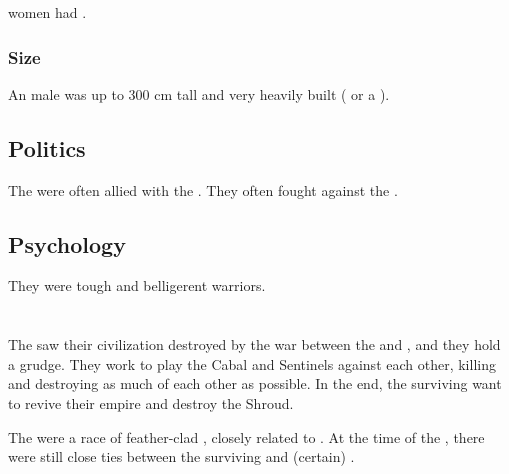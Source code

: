 \Aryoth{} women had . 





\subsubsection{Size}
An \aryoth male was up to 300 cm tall and very heavily built ( or a \human). 











\subsection{Politics}
The \aryothim{} were often allied with the \vorcanths. 
They often fought against the \quiljaaran. 









\subsection{Psychology}
They were tough and belligerent warriors. 















\section{\Cuezcans}
\index{\Cuezca}
The \cuezcans{} saw their civilization destroyed by the war between the \dragons{} and \banes{}, and they hold a grudge. 
They work to play the Cabal and Sentinels against each other, killing and destroying as much of each other as possible. 
In the end, the surviving \cuezcans{} want to revive their empire and destroy the Shroud. 

The \cuezcans{} were a race of feather-clad \saurians{}, closely related to \nycans. 
At the time of the \thirdbanewar, there were still close ties between the surviving \cuezcans{} and (certain) \nycans. 

